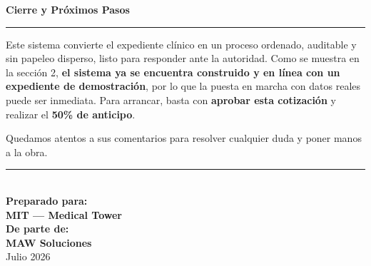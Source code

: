 \documentclass[11pt,letterpaper]{article}
\begin{document}
\vspace{14pt}

{\large\bfseries\color{azulcom}Cierre y Próximos Pasos}\\[4pt]
{\color{doradocom}\rule{\linewidth}{1pt}}

\vspace{8pt}

\noindent Este sistema convierte el expediente clínico en un proceso ordenado, auditable y sin papeleo disperso, listo para responder ante la autoridad. Como se muestra en la sección 2, \textbf{el sistema ya se encuentra construido y en línea con un expediente de demostración}, por lo que la puesta en marcha con datos reales puede ser inmediata. Para arrancar, basta con \textbf{aprobar esta cotización} y realizar el \textbf{50\% de anticipo}.

\vspace{6pt}

\noindent Quedamos atentos a sus comentarios para resolver cualquier duda y poner manos a la obra.

\vspace{18pt}

\begin{center}
{\color{azulcom}\rule{7cm}{1.2pt}}\\[10pt]
{\normalsize\bfseries Preparado para:}\\[4pt]
{\Large\bfseries\color{azulcom}MIT --- Medical Tower}\\[10pt]
{\normalsize\bfseries De parte de:}\\[4pt]
{\Large\bfseries\color{azulcom}MAW Soluciones}\\[4pt]
{\small\color{gristexto}Julio 2026}
\end{center}
\end{document}

